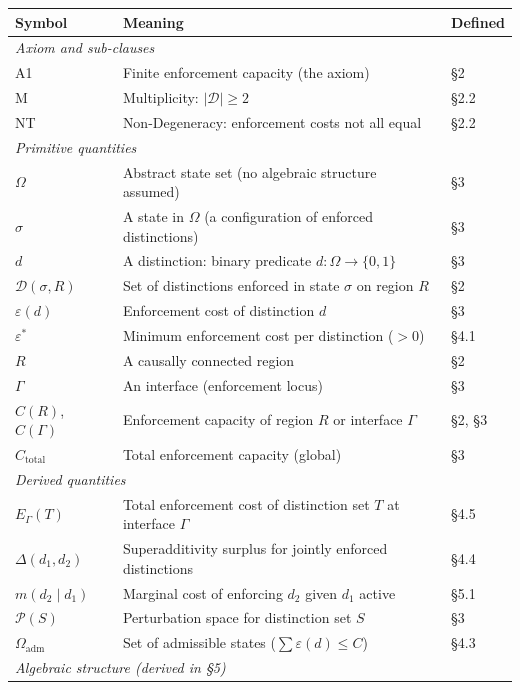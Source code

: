 \documentclass[11pt]{article}
\begin{document}
\begin{center}
\small
\begin{tabular}{lp{8.5cm}l}
\toprule
\textbf{Symbol} & \textbf{Meaning} & \textbf{Defined} \\
\midrule
\multicolumn{3}{l}{\textit{Axiom and sub-clauses}} \\[2pt]
A1 & Finite enforcement capacity (the axiom) & \S2 \\
M & Multiplicity: $|\mathcal{D}| \ge 2$ & \S2.2 \\
NT & Non-Degeneracy: enforcement costs not all equal & \S2.2 \\[4pt]
\multicolumn{3}{l}{\textit{Primitive quantities}} \\[2pt]
$\Omega$ & Abstract state set (no algebraic structure assumed) & \S3 \\
$\sigma$ & A state in $\Omega$ (a configuration of enforced distinctions) & \S3 \\
$d$ & A distinction: binary predicate $d: \Omega \to \{0,1\}$ & \S3 \\
$\mathcal{D}(\sigma,R)$ & Set of distinctions enforced in state $\sigma$ on region $R$ & \S2 \\
$\varepsilon(d)$ & Enforcement cost of distinction $d$ & \S3 \\
$\varepsilon^*$ & Minimum enforcement cost per distinction ($>0$) & \S4.1 \\
$R$ & A causally connected region & \S2 \\
$\Gamma$ & An interface (enforcement locus) & \S3 \\
$C(R)$, $C(\Gamma)$ & Enforcement capacity of region $R$ or interface $\Gamma$ & \S2, \S3 \\
$C_{\mathrm{total}}$ & Total enforcement capacity (global) & \S3 \\[4pt]
\multicolumn{3}{l}{\textit{Derived quantities}} \\[2pt]
$E_\Gamma(T)$ & Total enforcement cost of distinction set $T$ at interface $\Gamma$ & \S4.5 \\
$\Delta(d_1,d_2)$ & Superadditivity surplus for jointly enforced distinctions & \S4.4 \\
$m(d_2 \mid d_1)$ & Marginal cost of enforcing $d_2$ given $d_1$ active & \S5.1 \\
$\mathcal{P}(S)$ & Perturbation space for distinction set $S$ & \S3 \\
$\Omega_{\mathrm{adm}}$ & Set of admissible states ($\sum \varepsilon(d) \le C$) & \S4.3 \\[4pt]
\multicolumn{3}{l}{\textit{Algebraic structure (derived in \S5)}} \\[2pt]

\end{tabular}
\end{center}
\end{document}
